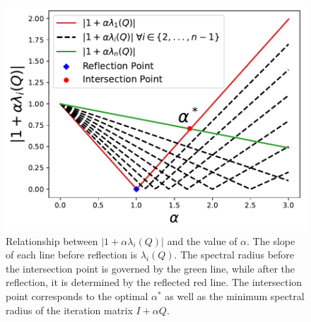 \documentclass[letterpaper]{article} %
\begin{document}
\begin{figure}[t!]
\centering
\includegraphics[width=0.85\linewidth]{Figures/alpha5.pdf}
\caption{Relationship between $|1 + \alpha \lambda_i(Q)|$ and the value of $\alpha$. The slope of each line before reflection is $\lambda_i\left(Q\right)$. The spectral radius before the intersection point is governed by the green line, while after the reflection, it is determined by the reflected red line. The intersection point corresponds to the optimal $\alpha^*$ as well as the minimum spectral radius of the iteration matrix $I + \alpha Q
$.}
\label{fig:1}
\end{figure}
\end{document}
